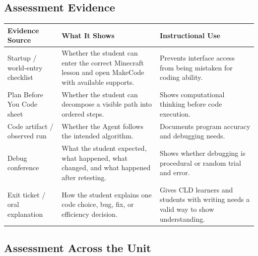 \documentclass[12pt]{article}
\begin{document}
\newpage
\subsection{Assessment Evidence}

\begin{xltabular}{\textwidth}{|P{1.3in}|P{2.5in}|P{2.5in}|}
\hline
{}\color{white}\bfseries Evidence Source & \color{white}\bfseries What It Shows & \color{white}\bfseries Instructional Use \\
\hline
Startup / world-entry checklist & Whether the student can enter the correct Minecraft lesson and open MakeCode with available supports. & Prevents interface access from being mistaken for coding ability. \\
\hline
{} Plan Before You Code sheet & Whether the student can decompose a visible path into ordered steps. & Shows computational thinking before code execution. \\
\hline
Code artifact / observed run & Whether the Agent follows the intended algorithm. & Documents program accuracy and debugging needs. \\
\hline
{} Debug conference & What the student expected, what happened, what changed, and what happened after retesting. & Shows whether debugging is procedural or random trial and error. \\
\hline
Exit ticket / oral explanation & How the student explains one code choice, bug, fix, or efficiency decision. & Gives CLD learners and students with writing needs a valid way to show understanding. \\
\hline
\end{xltabular}

\subsection{Assessment Across the Unit}
\end{document}
